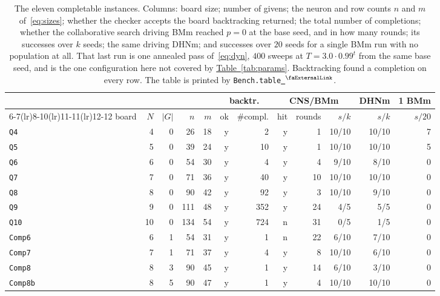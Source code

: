 \documentclass{easychair}
\newcommand{\tabref}[1]{\textcolor{academicpurple}{\hyperref[#1]{Table~\ref*{#1}}}}
\newcommand{\extlink}{~\ensuremath{{}^\text{\faExternalLink}}}
\newcommand{\repoowner}{mkaratarakis/HNBM}
\newcommand{\reporef}{1bd91612ee31180f6c99fa11090b713f3012ead4}
\newcommand{\repo}{https://github.com/\repoowner/blob/\reporef}
\newcommand{\srcl}[2]{\href{\repo/#1\#L#2}{\extlink}}
\newcommand{\qsrc}[2]{\srcl{HopfieldNet/QUBO/Instances/Queens/#1}{#2}}
\begin{document}
\begin{table}[H]
\centering\footnotesize
\setlength{\tabcolsep}{3.5pt}
\begin{tabular}{@{}lrrrr rr rrr r r@{}}
\toprule
& & & & & \multicolumn{2}{c}{backtr.}
& \multicolumn{3}{c}{CNS/BMm} & DHNm & 1 BMm\\
\cmidrule(lr){6-7}\cmidrule(lr){8-10}\cmidrule(lr){11-11}\cmidrule(lr){12-12}
board & $N$ & $|G|$ & $n$ & $m$ & ok & \#compl. & hit & rounds & $s/k$ & $s/k$ & $s/20$\\
\midrule
\texttt{Q4}     & 4  & 0 & 26  & 18 & y & 2   & y & 1  & 10/10 & 10/10 & 7\\
\texttt{Q5}     & 5  & 0 & 39  & 24 & y & 10  & y & 1  & 10/10 & 10/10 & 5\\
\texttt{Q6}     & 6  & 0 & 54  & 30 & y & 4   & y & 4  & 9/10  & 8/10  & 0\\
\texttt{Q7}     & 7  & 0 & 71  & 36 & y & 40  & y & 10 & 10/10 & 10/10 & 0\\
\texttt{Q8}     & 8  & 0 & 90  & 42 & y & 92  & y & 3  & 10/10 & 9/10  & 0\\
\texttt{Q9}     & 9  & 0 & 111 & 48 & y & 352 & y & 24 & 4/5   & 5/5   & 0\\
\texttt{Q10}    & 10 & 0 & 134 & 54 & y & 724 & n & 31 & 0/5   & 1/5   & 0\\
\midrule
\texttt{Comp6}  & 6  & 1 & 54  & 31 & y & 1   & n & 22 & 6/10  & 7/10  & 0\\
\texttt{Comp7}  & 7  & 1 & 71  & 37 & y & 4   & y & 8  & 10/10 & 6/10  & 0\\
\texttt{Comp8}  & 8  & 3 & 90  & 45 & y & 1   & y & 14 & 6/10  & 3/10  & 0\\
\texttt{Comp8b} & 8  & 5 & 90  & 47 & y & 1   & y & 4  & 10/10 & 10/10 & 0\\
\bottomrule
\end{tabular}
\caption{The eleven completable instances. Columns: board size; number of givens; the neuron and row
counts $n$ and $m$ of~\eqref{eq:sizes}; whether the checker accepts the board backtracking returned;
the total number of completions; whether the collaborative search driving BMm reached $p = 0$ at the
base seed, and in how many rounds; its successes over $k$ seeds; the same driving DHNm; and
successes over $20$ seeds for a single BMm run with no population at all. That last run is one
annealed pass of~\eqref{eq:dyn}, $400$ sweeps at $T = 3.0 \cdot 0.99^{t}$ from the same base seed,
and is the one configuration here not covered by \tabref{tab:params}. Backtracking found a
completion on every row. The table is printed by
\texttt{Bench.table}\qsrc{Bench.lean}{247}.}\label{tab:results}
\end{table}
\end{document}

